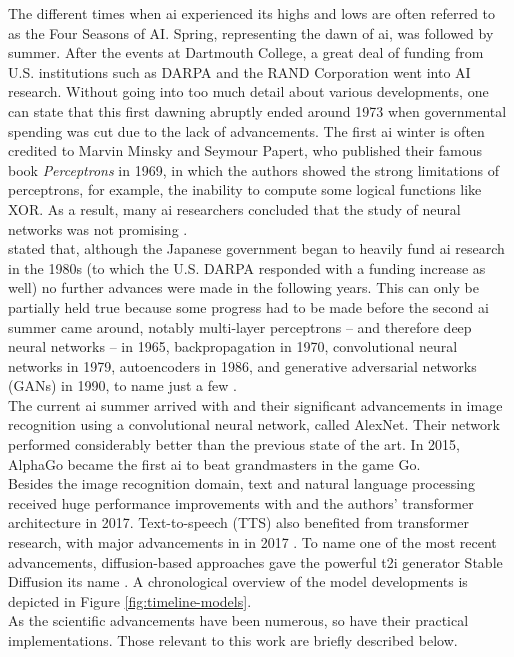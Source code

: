 \documentclass[
  a4paper,  %
  twoside,  %
  bibliography=totoc,
  headsepline,
  cleardoublepage=empty,
  parskip=half,
  draft=false
]{scrbook}
\begin{document}
The different times when \gls{ai} experienced its highs and lows are often referred to as the Four Seasons of AI. Spring, representing the dawn of \gls{ai}, was followed by summer. After the events at Dartmouth College, a great deal of funding from U.S. institutions such as DARPA and the RAND Corporation went into AI research. Without going into too much detail about various developments, one can state that this first dawning abruptly ended around 1973 when governmental spending was cut due to the lack of advancements. The first \gls{ai} winter is often credited to Marvin Minsky and Seymour Papert, who published their famous book \textit{Perceptrons} \cite{minskyPerceptronsIntroductionComputational2017} in 1969, in which the authors showed the strong limitations of perceptrons, for example, the inability to compute some logical functions like XOR. As a result, many \gls{ai} researchers concluded that the study of neural networks was not promising \cite{flasinskiHistoryArtificialIntelligence2016}. \\
 stated that, although the Japanese government began to heavily fund \gls{ai} research in the 1980s (to which the U.S. DARPA responded with a funding increase as well) no further advances were made in the following years. This can only be partially held true because some progress had to be made before the second \gls{ai} summer came around, notably multi-layer perceptrons – and therefore deep neural networks – in 1965, backpropagation in 1970, convolutional neural networks in 1979, autoencoders in 1986, and generative adversarial networks (GANs) in 1990, to name just a few \cite{schmidhuberAnnotatedHistoryModern2022}. \\

The current \gls{ai} summer arrived with \citet{krizhevskyImageNetClassificationDeep2012} and their significant advancements in image recognition using a convolutional neural network, called AlexNet. Their network performed considerably better than the previous state of the art. In 2015, AlphaGo became the first \gls{ai} to beat grandmasters in the game Go. \\
Besides the image recognition domain, text and natural language processing received huge performance improvements with  and the authors' transformer architecture in 2017. Text-to-speech (TTS) also benefited from transformer research, with major advancements in  in 2017 \cite{wangTacotronEndtoEndSpeech2017}. To name one of the most recent advancements, diffusion-based approaches gave the powerful \gls{t2i} generator Stable Diffusion its name \cite{rombachHighResolutionImageSynthesis2022}. A chronological overview of the model developments is depicted in Figure \ref{fig:timeline-models}. \\
As the scientific advancements have been numerous, so have their practical implementations. Those relevant to this work are briefly described below.
\end{document}
